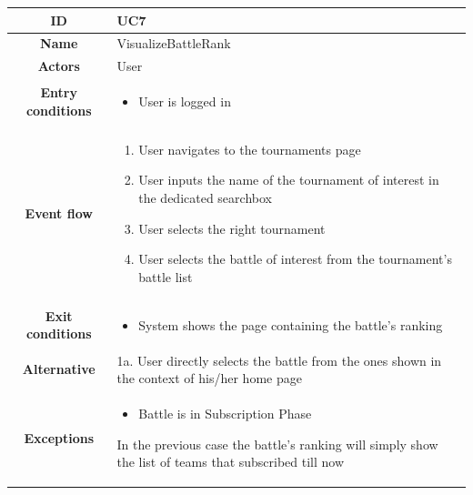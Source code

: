 \begin{center}
    \begin{tabular}{ |c|m{10cm}| }
        \hline
        \textbf{ID} & UC7 \\
        \hline
        \textbf{Name} & VisualizeBattleRank \\
        \hline
        \textbf{Actors} & User \\
        \hline
        \textbf{Entry conditions} &
        \begin{itemize}
            \item User is logged in
        \end{itemize} \\
        \hline
        \textbf{Event flow} &
        \begin{enumerate}
            \item User navigates to the tournaments page
            \item User inputs the name of the tournament of interest in the dedicated searchbox
            \item User selects the right tournament
            \item User selects the battle of interest from the tournament’s battle list
        \end{enumerate} \\
        \hline
        \textbf{Exit conditions} &
        \begin{itemize}
            \item System shows the page containing the battle’s ranking
        \end{itemize} \\
        \hline
        \textbf{Alternative} & 
            1a. User directly selects the battle from the ones shown in the context of his/her home page \\
        \hline
        \textbf{Exceptions} & 
        \begin{itemize}
            \item Battle is in Subscription Phase
        \end{itemize} 
        In the previous case the battle's ranking will simply show the list of teams that subscribed till now \\
        \hline
    \end{tabular}
    \begin{figure}[H]
        \hspace{90px}

\end{figure}
\end{center}
